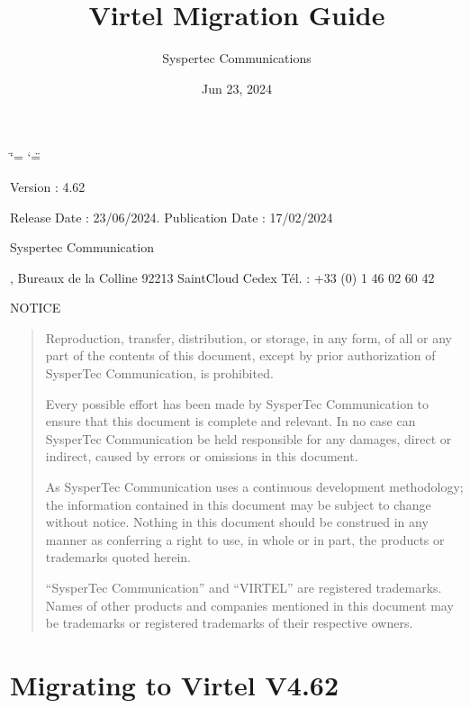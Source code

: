 \documentclass[letterpaper,10pt,english]{sphinxmanual}
\title{Virtel Migration Guide}
\date{Jun 23, 2024}
\author{Syspertec Communications}
\begin{document}
\ifdefined\shorthandoff
  \ifnum\catcode`\=\string=\active\shorthandoff{=}\fi
  \ifnum\catcode`\"=\active{}\fi
\fi

\pagestyle{empty}
\sphinxmaketitle
\pagestyle{plain}
\sphinxtableofcontents
\pagestyle{normal}
\label{\detokenize{Migration_Guide::doc}}


\sphinxAtStartPar
{}

\sphinxAtStartPar
Version : 4.62

\sphinxAtStartPar
Release Date : 23/06/2024. Publication Date : 17/02/2024

\sphinxAtStartPar
Syspertec Communication

, Bureaux de la Colline 92213 Saint\sphinxhyphen{}Cloud Cedex Tél. : +33 (0) 1 46 02 60 42

\sphinxAtStartPar
{}

\sphinxAtStartPar
NOTICE
\begin{quote}

\sphinxAtStartPar
Reproduction, transfer, distribution, or storage, in any form, of all or any part of
the contents of this document, except by prior authorization of SysperTec
Communication, is prohibited.

\sphinxAtStartPar
Every possible effort has been made by SysperTec Communication to ensure that this document
is complete and relevant. In no case can SysperTec Communication be held responsible for
any damages, direct or indirect, caused by errors or omissions in this document.

\sphinxAtStartPar
As SysperTec Communication uses a continuous development methodology; the information
contained in this document may be subject to change without notice. Nothing in this
document should be construed in any manner as conferring a right to use, in whole or in
part, the products or trademarks quoted herein.

\sphinxAtStartPar
“SysperTec Communication” and “VIRTEL” are registered trademarks. Names of other products
and companies mentioned in this document may be trademarks or registered trademarks of
their respective owners.
\end{quote}

\newpage

\ignorespaces 

\chapter{Migrating to Virtel V4.62}
\label{\detokenize{Migration_Guide:migrating-to-virtel-v4-62}}\label{\detokenize{Migration_Guide:v462mi-introduction}}\label{\detokenize{Migration_Guide:index-0}}
\end{document}
